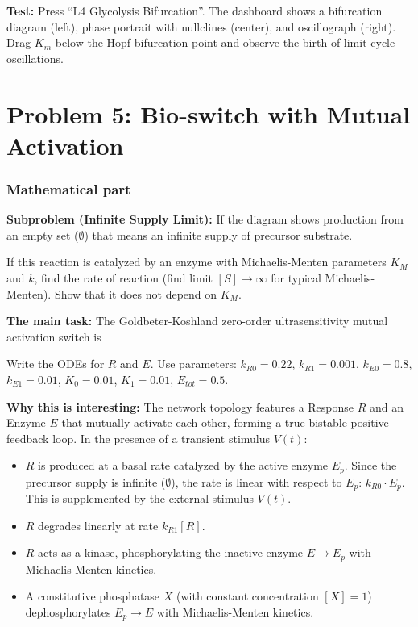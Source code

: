 \documentclass[11pt]{article}
\begin{document}
\textbf{Test:} Press ``L4 Glycolysis Bifurcation''. The dashboard shows a bifurcation diagram (left), phase portrait with nullclines (center), and oscillograph (right). Drag $K_m$ below the Hopf bifurcation point and observe the birth of limit-cycle oscillations.

\section*{Problem 5: Bio-switch with Mutual Activation}

\subsubsection*{Mathematical part}
\textbf{Subproblem (Infinite Supply Limit):} If the diagram shows production from an empty set ($\emptyset$) that means an infinite supply of precursor substrate.

If this reaction is catalyzed by an enzyme with Michaelis-Menten parameters $K_M$ and $k$, find the rate of reaction (find limit $[S] \to \infty$ for typical Michaelis-Menten).
Show that it does not depend on $K_M$.

\textbf{The main task:} The Goldbeter-Koshland zero-order ultrasensitivity mutual activation switch is
\begin{center}
  
\end{center}
Write the ODEs for $R$ and $E$. Use parameters: $k_{R0} = 0.22$, $k_{R1} = 0.001$, $k_{E0} = 0.8$, $k_{E1} = 0.01$, $K_0 = 0.01$, $K_1 = 0.01$, $E_{tot} = 0.5$.


\textbf{Why this is interesting:} The network topology features a Response $R$ and an Enzyme $E$ that mutually activate each other, forming a true bistable positive feedback loop. In the presence of a transient stimulus $V(t)$:
\begin{itemize}
    \item $R$ is produced at a basal rate catalyzed by the active enzyme $E_p$. Since the precursor supply is infinite ($\emptyset$), the rate is linear with respect to $E_p$: $k_{R0} \cdot E_p$. This is supplemented by the external stimulus $V(t)$.
    \item $R$ degrades linearly at rate $k_{R1} [R]$.
    \item $R$ acts as a kinase, phosphorylating the inactive enzyme $E \to E_p$ with Michaelis-Menten kinetics.
    \item A constitutive phosphatase $X$ (with constant concentration $[X]=1$) dephosphorylates $E_p \to E$ with Michaelis-Menten kinetics.
\end{itemize}
\end{document}
